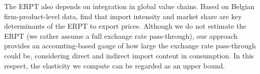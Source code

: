 \documentclass[11pt,a4paper]{paper} %
\begin{document}
The ERPT also depends on integration in global value chains. 
Based on Belgian firm-product-level data, \cite{Amiti2014} find that import intensity and market share are key determinants of the ERPT to
export prices.
Although we do not estimate the ERPT (we rather assume a full exchange rate pass-through), our approach provides an accounting-based gauge of how large the exchange rate pass-through could be, considering direct and indirect import content in consumption. In this respect, the elasticity we compute can be regarded as an upper bound. \\

 
\end{document}
